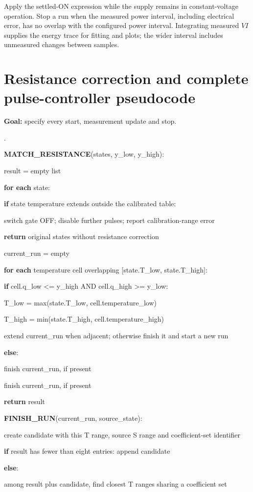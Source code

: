 \documentclass[11pt,letterpaper]{article}
\newcounter{pseudoline}
\newenvironment{pseudocode}{%
  \par\begingroup\small
  \setcounter{pseudoline}{0}
  \begin{list}{\arabic{pseudoline}.}{%
    \usecounter{pseudoline}
    \setlength{\leftmargin}{2.5em}
    \setlength{\labelwidth}{1.9em}
    \setlength{\labelsep}{0.6em}
    \setlength{\itemsep}{0.15em}
    \setlength{\parsep}{0pt}
    \setlength{\topsep}{0.35em}}%
  }{\end{list}\endgroup\par}
\newcommand{\pcstep}[2]{%
  \item \hspace*{#1em}%
  \parbox[t]{\dimexpr\linewidth-#1em\relax}{\raggedright #2\strut}}
\begin{document}
Apply the settled-ON expression while the supply remains in constant-voltage operation. Stop a run when the measured power interval, including electrical error, has no overlap with the configured power interval. Integrating measured \(VI\) supplies the energy trace for fitting and plots; the wider interval includes unmeasured changes between samples.

\section{Resistance correction and complete pulse-controller pseudocode}

\textbf{Goal:} specify every start, measurement update and stop.

\begin{pseudocode}
\pcstep{0.0}{\textbf{MATCH\_\allowbreak{}RESISTANCE}(states, y\_\allowbreak{}low, y\_\allowbreak{}high):}
\pcstep{1.0}{result = empty list}
\pcstep{1.0}{\textbf{for each} state:}
\pcstep{2.0}{\textbf{if} state temperature extends outside the calibrated table:}
\pcstep{3.0}{switch gate OFF; disable further pulses; report calibration-range error}
\pcstep{3.0}{\textbf{return} original states without resistance correction}
\pcstep{2.0}{current\_\allowbreak{}run = empty}
\pcstep{2.0}{\textbf{for each} temperature cell overlapping [state.T\_\allowbreak{}low, state.T\_\allowbreak{}high]:}
\pcstep{3.0}{\textbf{if} cell.q\_\allowbreak{}low <= y\_\allowbreak{}high AND cell.q\_\allowbreak{}high >= y\_\allowbreak{}low:}
\pcstep{4.0}{T\_\allowbreak{}low = max(state.T\_\allowbreak{}low, cell.temperature\_\allowbreak{}low)}
\pcstep{4.0}{T\_\allowbreak{}high = min(state.T\_\allowbreak{}high, cell.temperature\_\allowbreak{}high)}
\pcstep{4.0}{extend current\_\allowbreak{}run when adjacent; otherwise finish it and start a new run}
\pcstep{3.0}{\textbf{else}:}
\pcstep{4.0}{finish current\_\allowbreak{}run, if present}
\pcstep{2.0}{finish current\_\allowbreak{}run, if present}
\pcstep{1.0}{\textbf{return} result}
\par\vspace{0.35em}
\pcstep{0.0}{\textbf{FINISH\_\allowbreak{}RUN}(current\_\allowbreak{}run, source\_\allowbreak{}state):}
\pcstep{1.0}{create candidate with this T range, source S range and coefficient-set identifier}
\pcstep{1.0}{\textbf{if} result has fewer than eight entries: append candidate}
\pcstep{1.0}{\textbf{else}:}
\pcstep{2.0}{among result plus candidate, find closest T ranges sharing a coefficient set}

\end{pseudocode}
\end{document}
